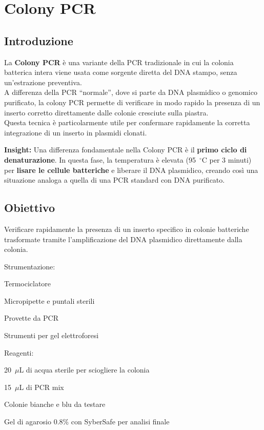 \section{Colony PCR}

\subsection{Introduzione}
La \textbf{Colony PCR} è una variante della PCR tradizionale in cui la colonia batterica intera viene usata come sorgente diretta del DNA stampo, senza un’estrazione preventiva.\\
A differenza della PCR “normale”, dove si parte da DNA plasmidico o genomico purificato, la colony PCR permette di verificare in modo rapido la presenza di un inserto corretto direttamente dalle colonie cresciute sulla piastra.\\
Questa tecnica è particolarmente utile per confermare rapidamente la corretta integrazione di un inserto in plasmidi clonati.

\begin{insightBox}
  \textbf{Insight:} Una differenza fondamentale nella Colony PCR è il \textbf{primo ciclo di denaturazione}. In questa fase, la temperatura è elevata (95~$^\circ$C per 3 minuti) per \textbf{lisare le cellule batteriche} e liberare il DNA plasmidico, creando così una situazione analoga a quella di una PCR standard con DNA purificato.
\end{insightBox}

\subsection{Obiettivo}
Verificare rapidamente la presenza di un inserto specifico in colonie batteriche trasformate tramite l’amplificazione del DNA plasmidico direttamente dalla colonia.

\vspace{1em}
\twoColumnLayout
{Strumentazione:}
{
  \item Termociclatore
  \item Micropipette e puntali sterili
  \item Provette da PCR
  \item Strumenti per gel elettroforesi
}
{Reagenti:}
{
  \item 20~$\mu$L di acqua sterile per sciogliere la colonia
  \item 15~$\mu$L di PCR mix
  \item Colonie bianche e blu da testare
  \item Gel di agarosio 0.8\% con SyberSafe per analisi finale
}

